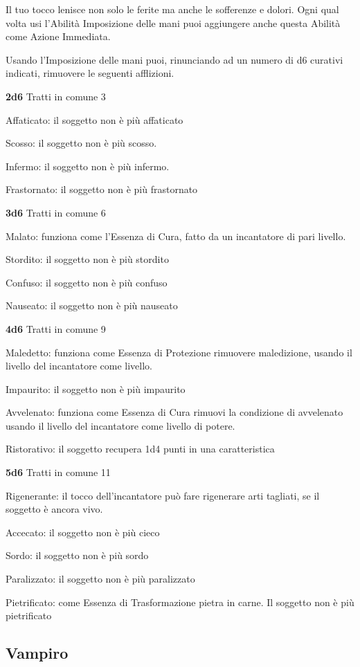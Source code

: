 \documentclass[a4paper,11pt,twoside,openany]{book}
\begin{document}
Il tuo tocco lenisce non solo le ferite ma anche le sofferenze e dolori. Ogni qual volta usi l'Abilità Imposizione delle mani puoi aggiungere anche questa Abilità come Azione Immediata.

Usando l'Imposizione delle mani puoi, rinunciando ad un numero di d6 curativi indicati, rimuovere le seguenti afflizioni.

\textbf{2d6} Tratti in comune 3

Affaticato: il soggetto non è più affaticato

Scosso: il soggetto non è più scosso.

Infermo: il soggetto non è più infermo.

Frastornato: il soggetto non è più frastornato

\textbf{3d6} Tratti in comune 6

Malato: funziona come l'Essenza di Cura, fatto da un incantatore di pari livello.

Stordito: il soggetto non è più stordito

Confuso: il soggetto non è più confuso

Nauseato: il soggetto non è più nauseato

\textbf{4d6} Tratti in comune 9

Maledetto: funziona come Essenza di Protezione rimuovere maledizione, usando il livello del incantatore come livello.

Impaurito: il soggetto non è più impaurito

Avvelenato: funziona come Essenza di Cura rimuovi la condizione di avvelenato usando il livello del incantatore come livello di potere.

Ristorativo: il soggetto recupera 1d4 punti in una caratteristica

\textbf{5d6} Tratti in comune 11

Rigenerante: il tocco dell'incantatore può fare rigenerare arti tagliati, se il soggetto è ancora vivo.

Accecato: il soggetto non è più cieco

Sordo: il soggetto non è più sordo

Paralizzato: il soggetto non è più paralizzato

Pietrificato: come Essenza di Trasformazione pietra in carne. Il soggetto non è più pietrificato

\subsection{Vampiro}
\end{document}
